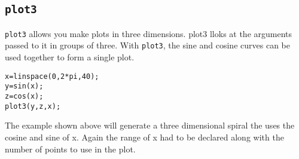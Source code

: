 \documentclass[12pt]{article}
\begin{document}
\subsection{\texttt{plot3}}

\texttt{plot3} allows you make plots in three dimensions. plot3 lloks at the arguments passed to it in groups of three. With  \texttt{plot3}, the sine and cosine curves can be used together to form a single plot.
\begin{framed}
\begin{verbatim}
x=linspace(0,2*pi,40);
y=sin(x);
z=cos(x);
plot3(y,z,x);
\end{verbatim}
\end{framed}
The example shown above will generate a three dimensional spiral the uses the cosine and sine of x. Again the range of x had to be declared along with the number of points to use in the plot.
\end{document}
